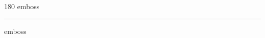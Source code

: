 
\begin{frame}
\begin{center}
\begin{turn}{180}
{\fontsize{2.5cm}{1em}\selectfont emboss}
\end{turn}
\vspace{1em}\par  
\hrule
\vspace{1em}\par  
{\fontsize{2.5cm}{1em}\selectfont emboss}
\end{center}
\end{frame}
